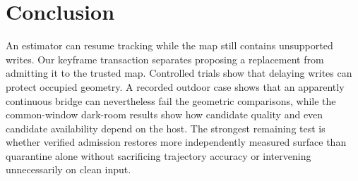 \documentclass[journal]{IEEEtran}
\begin{document}
\section{Conclusion}
An estimator can resume tracking while the map still contains unsupported writes. Our keyframe transaction separates proposing a replacement from admitting it to the trusted map. Controlled trials show that delaying writes can protect occupied geometry. A recorded outdoor case shows that an apparently continuous bridge can nevertheless fail the geometric comparisons, while the common-window dark-room results show how candidate quality and even candidate availability depend on the host. The strongest remaining test is whether verified admission restores more independently measured surface than quarantine alone without sacrificing trajectory accuracy or intervening unnecessarily on clean input.



\end{document}
